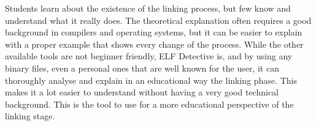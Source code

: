 Students learn about the existence of the linking process, but few know and understand what it really does. The theoretical explanation often requires a good background in compilers and operating systems, but it can be easier to explain with a proper example that shows every change of the process. While the other available tools are not beginner friendly, ELF Detective is, and by using any binary files, even a personal ones that are well known for the user, it can thoroughly analyse and explain in an educational way the linking phase. This makes it a lot easier to understand without having a very good technical background. This is the tool to use for a more educational perspective of the linking stage.